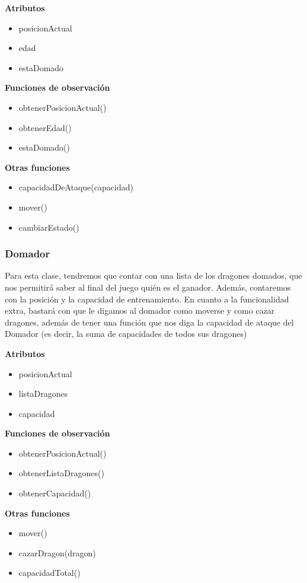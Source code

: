 \documentclass{article}
\begin{document}
\textbf{Atributos}
\begin{itemize}
\item posicionActual
\item edad
\item estaDomado
\end{itemize}

\textbf{Funciones de observación}
\begin{itemize}
\item obtenerPosicionActual()
\item obtenerEdad()
\item estaDomado()
\end{itemize}

\textbf{Otras funciones}
\begin{itemize}
\item capacidadDeAtaque(capacidad)
\item mover()
\item cambiarEstado()
\end{itemize}

\subsubsection{Domador}
Para esta clase, tendremos que contar con una lista de los dragones domados, que nos permitirá saber al final del juego quién es el ganador. Además, contaremos con la posición y la capacidad de entrenamiento. En cuanto a la funcionalidad extra, bastará con que le digamos al domador como moverse y como cazar dragones, además de tener una función que nos diga la capacidad de ataque del Domador (es decir, la suma de capacidades de todos sus dragones)

\textbf{Atributos}
\begin{itemize}
\item posicionActual
\item listaDragones
\item capacidad
\end{itemize}

\textbf{Funciones de observación}
\begin{itemize}
\item obtenerPosicionActual()
\item obtenerListaDragones()
\item obtenerCapacidad()
\end{itemize}

\textbf{Otras funciones}
\begin{itemize}
\item mover()
\item cazarDragon(dragon)
\item capacidadTotal()
\end{itemize}
\end{document}
